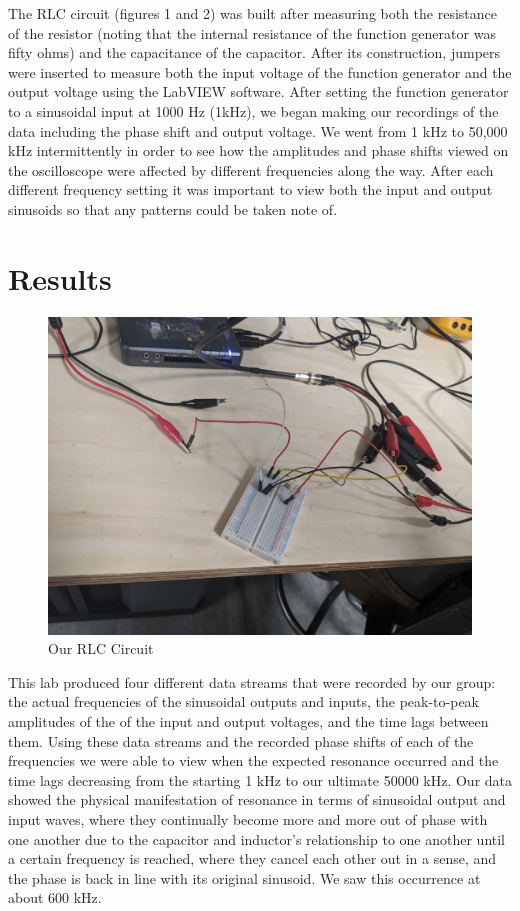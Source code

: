 \documentclass[10pt,twocolumn]{article}
\begin{document}
The RLC circuit (figures 1 and 2) was built after measuring both the resistance of the resistor (noting that the internal resistance of the function generator was fifty ohms) and the capacitance of the capacitor. After its construction, jumpers were inserted to measure both the input voltage of the function generator and the output voltage using the LabVIEW software. After setting the function generator to a sinusoidal input at 1000 Hz (1kHz), we began making our recordings of the data including the phase shift and output voltage. We went from 1 kHz to 50,000 kHz intermittently in order to see how the amplitudes and phase shifts viewed on the oscilloscope were affected by different frequencies along the way. After each different frequency setting it was important to view both the input and output sinusoids so that any patterns could be taken note of.  


\section{Results}
\label{sec:results}

\begin{figure}[bt]
	\centering
	\includegraphics[width=.9\linewidth]{figures/RLCcircuit.PNG}
	\caption{Our RLC Circuit}
	\label{fig:diagram2}
\end{figure}

This lab produced four different data streams that were recorded by our group: the actual frequencies of the sinusoidal outputs and inputs, the peak-to-peak amplitudes of the of the input and output voltages, and the time lags between them. Using these data streams and the recorded phase shifts of each of the frequencies we were able to view when the expected resonance occurred and the time lags decreasing from the starting 1 kHz to our ultimate 50000 kHz. Our data showed the physical manifestation of resonance in terms of sinusoidal output and input waves, where they continually become more and more out of phase with one another due to the capacitor and inductor’s relationship to one another until a certain frequency is reached, where they cancel each other out in a sense, and the phase is back in line with its original sinusoid. We saw this occurrence at about 600 kHz. 
\end{document}

